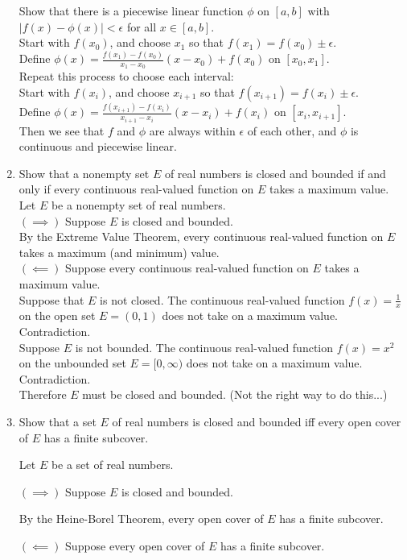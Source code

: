 \begin{enumerate}
	Show that there is a piecewise linear function $\phi$ on $[a,b]$ with $|f(x)-\phi (x)| < \epsilon$ for all $x \in [a,b]$.\\
	Start with $f(x_0)$, and choose $x_1$ so that $f(x_1)=f(x_0)\pm \epsilon$.\\
	Define $\phi(x) = \frac{f(x_1)-f(x_0)}{x_1-x_0}(x-x_0)+f(x_0)$ on $[x_0,x_1]$.\\
	Repeat this process to choose each interval:\\
	Start with $f(x_i)$, and choose $x_{i+1}$ so that $f(x_{i+1})=f(x_i)\pm \epsilon$.\\
	Define $\phi(x) = \frac{f(x_{i+1})-f(x_i)}{x_{i+1}-x_i}(x-x_i)+f(x_i)$ on $[x_i,x_{i+1}]$.\\
	Then we see that $f$ and $\phi$ are always within $\epsilon$ of each other, and $\phi$ is continuous and piecewise linear.
	\item Show that a nonempty set $E$ of real numbers is closed and bounded if and only if every continuous real-valued function on $E$ takes a maximum value.\\
	Let $E$ be a nonempty set of real numbers.\\
	$(\implies)$ Suppose $E$ is closed and bounded.\\
	By the Extreme Value Theorem, every continuous real-valued function on $E$ takes a maximum (and minimum) value.\\
	$(\impliedby)$ Suppose every continuous real-valued function on $E$ takes a maximum value.\\
	Suppose that $E$ is not closed.
	The continuous real-valued function $f(x)=\frac{1}{x}$ on the open set $E=(0,1)$ does not take on a maximum value. Contradiction.\\
	Suppose $E$ is not bounded. 
	The continuous real-valued function $f(x)=x^2$ on the unbounded set $E=[0,\infty)$ does not take on a maximum value. Contradiction.\\
	Therefore $E$ must be closed and bounded.
	(Not the right way to do this...)
	\item Show that a set $E$ of real numbers is closed and bounded iff every open cover of $E$ has a finite subcover.\par
	Let $E$ be a set of real numbers.\par
	$(\implies)$ Suppose $E$ is closed and bounded.\par
	By the Heine-Borel Theorem, every open cover of $E$ has a finite subcover.
	\par
	$(\impliedby)$ Suppose every open cover of $E$ has a finite subcover.\par

\end{enumerate}
